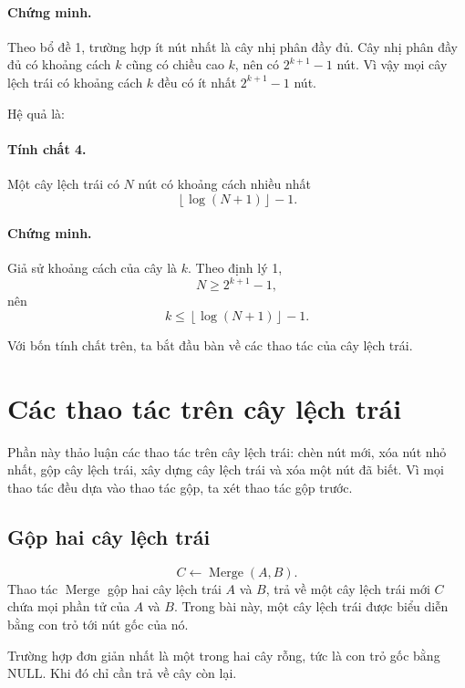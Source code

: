 \documentclass[11pt]{article}
\begin{document}
\paragraph{Chứng minh.}
Theo bổ đề 1, trường hợp ít nút nhất là cây nhị phân đầy đủ. Cây nhị phân đầy
đủ có khoảng cách \(k\) cũng có chiều cao \(k\), nên có \(2^{k+1}-1\) nút. Vì
vậy mọi cây lệch trái có khoảng cách \(k\) đều có ít nhất \(2^{k+1}-1\) nút.

Hệ quả là:

\paragraph{Tính chất 4.}
Một cây lệch trái có \(N\) nút có khoảng cách nhiều nhất
\[
  \left\lfloor \log(N+1)\right\rfloor - 1.
\]

\paragraph{Chứng minh.}
Giả sử khoảng cách của cây là \(k\). Theo định lý 1,
\[
  N\ge 2^{k+1}-1,
\]
nên
\[
  k\le \left\lfloor \log(N+1)\right\rfloor - 1.
\]

Với bốn tính chất trên, ta bắt đầu bàn về các thao tác của cây lệch trái.

\section{Các thao tác trên cây lệch trái}

Phần này thảo luận các thao tác trên cây lệch trái: chèn nút mới, xóa nút nhỏ
nhất, gộp cây lệch trái, xây dựng cây lệch trái và xóa một nút đã biết. Vì mọi
thao tác đều dựa vào thao tác gộp, ta xét thao tác gộp trước.

\subsection{Gộp hai cây lệch trái}

\[
  C \gets \operatorname{Merge}(A,B).
\]
Thao tác \(\operatorname{Merge}\) gộp hai cây lệch trái \(A\) và \(B\), trả về
một cây lệch trái mới \(C\) chứa mọi phần tử của \(A\) và \(B\). Trong bài này,
một cây lệch trái được biểu diễn bằng con trỏ tới nút gốc của nó.

Trường hợp đơn giản nhất là một trong hai cây rỗng, tức là con trỏ gốc bằng
\(\mathrm{NULL}\). Khi đó chỉ cần trả về cây còn lại.
\end{document}
